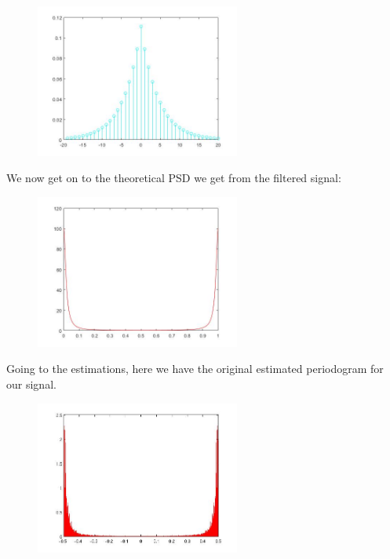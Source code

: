 \documentclass[a4paper,11pt]{article}
\begin{document}
\begin{figure}[!hp]
    \begin{center}
    \includegraphics[width=0.6\textwidth]{images/lab2_figure2.jpg}
    \end{center}
\end{figure}

\newpage

We now get on to the theoretical PSD we get from the filtered signal:

\begin{figure}[!hp]
    \begin{center}
    \includegraphics[width=0.6\textwidth]{images/lab1_figure1_3.jpg}
    \end{center}
\end{figure}

Going to the estimations, here we have the original estimated periodogram for our signal.

\begin{figure}[!hp]
    \begin{center}
    \includegraphics[width=0.6\textwidth]{images/lab2_redo_figure15.jpg}
    \end{center}
\end{figure}
\end{document}
